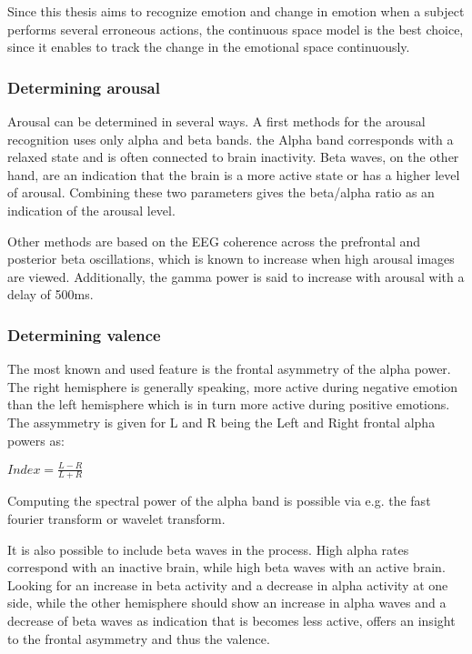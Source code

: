 \npar

Since this thesis aims to recognize emotion and change in emotion when a subject performs several erroneous actions, the continuous space model is the best choice, since it enables to track the change in the emotional space continuously.


\subsubsection{Determining arousal}

Arousal can be determined in several ways. A first methods for the arousal recognition uses only alpha and beta bands. the Alpha band corresponds with a relaxed state and is often connected to brain inactivity\cite{ExtendedPaper,RealTimeEEGEmotion}. Beta waves, on the other hand, are an indication that the brain is a more active state or has a higher level of arousal. Combining these two parameters gives the beta/alpha ratio as an indication of the arousal level. 

\npar

Other methods are based on the EEG coherence across the prefrontal and posterior beta oscillations, which is known to increase when high arousal images are viewed. Additionally, the gamma power is said to increase with arousal with a delay of 500ms\cite{GivenPaper}.

\subsubsection{Determining valence}

The most known and used feature is the frontal asymmetry of the alpha power\cite{GivenPaper}.
The right hemisphere is generally speaking, more active during negative emotion than the left hemisphere which is in turn more active during positive emotions\cite{RealTimeEEGEmotion,EEGDatasets}. The assymmetry is given for L and R being the Left and Right frontal alpha powers as:\\
\begin{center}
$Index = \frac{L-R}{L+R}$
\end{center}
Computing the spectral power of the alpha band is possible via e.g. the fast fourier transform or wavelet transform.

\npar

It is also possible to include beta waves in the process. High alpha rates correspond with an inactive brain, while high beta waves with an active brain. Looking for an increase in beta activity and a decrease in alpha activity at one side, while the other hemisphere should show an increase in alpha waves and a decrease of beta waves as indication that is becomes less active, offers an insight to the frontal asymmetry and thus the valence\cite{ExtendedPaper}. 

